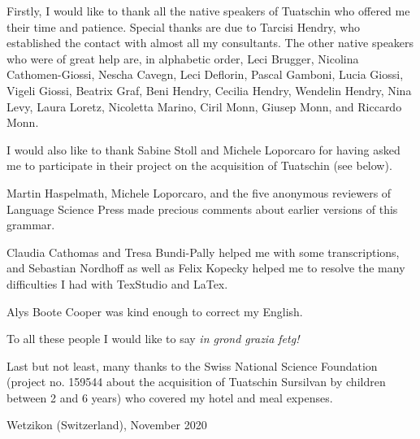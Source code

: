 
Firstly, I would like to thank all the native speakers of Tuatschin who offered me their time and patience. Special thanks are due to Tarcisi Hendry, who established the contact with almost all my consultants. The other native speakers who were of great help are, in alphabetic order, Leci Brugger, Nicolina Cathomen-Giossi, Nescha Cavegn, Leci Deflorin, Pascal Gamboni, Lucia Giossi, Vigeli Giossi, Beatrix Graf, Beni Hendry, Cecilia Hendry, Wendelin Hendry, Nina Levy, Laura Loretz, Nicoletta Marino, Ciril Monn, Giusep Monn, and Riccardo Monn.

I would also like to thank Sabine Stoll and Michele Loporcaro for having asked me to participate in their project on the acquisition of Tuatschin (see below).

Martin Haspelmath, Michele Loporcaro, and the five anonymous reviewers of Language Science Press made precious comments about earlier versions of this grammar.

Claudia Cathomas and Tresa Bundi-Pally helped me with some transcriptions, and Sebastian Nordhoff as well as Felix Kopecky helped me to resolve the many difficulties I had with TexStudio and LaTex.

Alys Boote Cooper was kind enough to correct my English.

To all these people I would like to say \textit{in grond grazia fetg!}

Last but not least, many thanks to the Swiss National Science Foundation (project no. 159544 about the acquisition of Tuatschin Sursilvan by children between 2 and 6 years) who covered my hotel and meal 
expenses.


\begin{flushright}
	Wetzikon (Switzerland), November 2020
\end{flushright}

